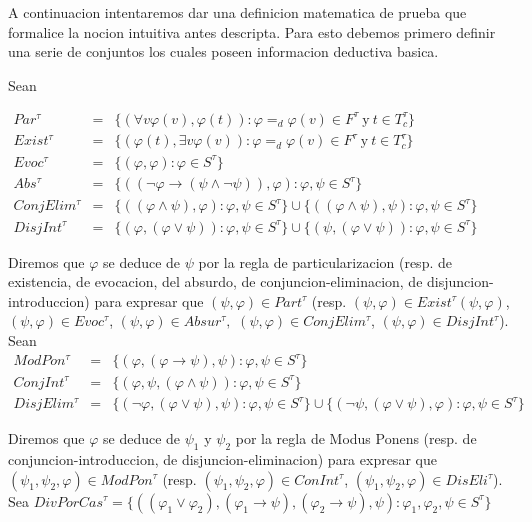 A continuacion intentaremos dar una definicion matematica de prueba que formalice la nocion intuitiva antes descripta. Para esto debemos primero definir una serie de conjuntos los cuales poseen informacion deductiva basica.

Sean

\(\displaystyle \begin{array}{rcl} Par^{\tau } & =& \{(\forall v\varphi (v),\varphi (t)):\varphi =_{d}\varphi (v)\in F^{\tau }\mathrm{\ y\ }t\in T_{c}^{\tau }\} \\ Exist^{\tau } & =& \{(\varphi (t),\exists v\varphi (v)):\varphi =_{d}\varphi (v)\in F^{\tau }\mathrm{\ y\ }t\in T_{c}^{\tau }\} \\ Evoc^{\tau } & =& \{(\varphi ,\varphi ):\varphi \in S^{\tau }\} \\ Abs^{\tau } & =& \{((\lnot \varphi \rightarrow (\psi \wedge \lnot \psi )),\varphi ):\varphi ,\psi \in S^{\tau }\} \\ ConjElim^{\tau } & =& \{((\varphi \wedge \psi ),\varphi ):\varphi ,\psi \in S^{\tau }\}\cup \{((\varphi \wedge \psi ),\psi ):\varphi ,\psi \in S^{\tau }\} \\ DisjInt^{\tau } & =& \{(\varphi ,(\varphi \vee \psi )):\varphi ,\psi \in S^{\tau }\}\cup \{(\psi ,(\varphi \vee \psi )):\varphi ,\psi \in S^{\tau }\} \end{array} \)

Diremos que \(\varphi \) se deduce de \(\psi \) por la regla de particularizacion (resp. de existencia, de evocacion, del absurdo, de conjuncion-eliminacion, de disjuncion-introduccion) para expresar que \( (\psi ,\varphi )\in Part^{\tau }\) (resp. \((\psi ,\varphi )\in Exist^{\tau }(\psi ,\varphi )\), \((\psi ,\varphi )\in Evoc^{\tau }\), \((\psi ,\varphi )\in Absur^{\tau },\) \((\psi ,\varphi )\in ConjElim^{\tau }\), \((\psi ,\varphi )\in DisjInt^{\tau }\)). Sean
\(\displaystyle \begin{array}{rcl} ModPon^{\tau } & =& \{(\varphi ,(\varphi \rightarrow \psi ),\psi ):\varphi ,\psi \in S^{\tau }\} \\ ConjInt^{\tau } & =& \{(\varphi ,\psi ,(\varphi \wedge \psi )):\varphi ,\psi \in S^{\tau }\} \\ DisjElim^{\tau } & =& \{(\lnot \varphi ,(\varphi \vee \psi ),\psi ):\varphi ,\psi \in S^{\tau }\}\cup \{(\lnot \psi ,(\varphi \vee \psi ),\varphi ):\varphi ,\psi \in S^{\tau }\} \end{array} \)

Diremos que \(\varphi \) se deduce de \(\psi _{1}\) y \(\psi _{2}\) por la regla de Modus Ponens (resp. de conjuncion-introduccion, de disjuncion-eliminacion) para expresar que \( (\psi _{1},\psi _{2},\varphi )\in ModPon^{\tau }\) (resp. \((\psi _{1},\psi _{2},\varphi )\in ConInt^{\tau }\), \((\psi _{1},\psi _{2},\varphi )\in DisEli^{\tau }\)). Sea
\(\displaystyle DivPorCas^{\tau }=\{((\varphi _{1}\vee \varphi _{2}),(\varphi _{1}\rightarrow \psi ),(\varphi _{2}\rightarrow \psi ),\psi ):\varphi _{1},\varphi _{2},\psi \in S^{\tau }\} \)

